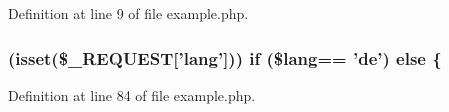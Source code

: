 Definition at line 9 of file example.\-php.

\hypertarget{example_8php_a62bf8b36de1aa08b54e9822dc49899aa}{
\subsubsection[{else}]{ (isset(\$\-\_\-\-R\-E\-Q\-U\-E\-S\-T\mbox{[}'lang'\mbox{]})) {\bf if} (\$lang== 'de') else \{}}\label{example_8php_a62bf8b36de1aa08b54e9822dc49899aa}


Definition at line 84 of file example.\-php.


